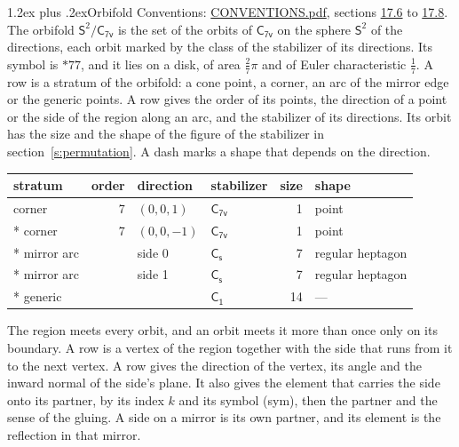 \documentclass[10pt,a4paper]{article}
\makeatletter
\renewcommand\section{\@startsection{section}{1}{\z@}{-3ex plus -1ex minus -.2ex}%
  {1.2ex plus .2ex}{\normalfont\large\sffamily\bfseries\color{parttitle}}}
\numberwithin{equation}{section}
\newcommand{\grp}[1]{\mathsf{#1}}
\newcommand{\orbname}[1]{#1}
\newcommand{\dirvec}[3]{(#1, #2, #3)}
\newcommand{\twosphere}{\mathsf{S}^{2}}
\makeatother
\begin{document}
\section{Orbifold}\label{s:orbifold}
Conventions: \href{../../CONVENTIONS.pdf}{CONVENTIONS.pdf}, sections \href{../../CONVENTIONS.pdf\#conv.17.6}{17.6} to \href{../../CONVENTIONS.pdf\#conv.17.8}{17.8}.
The orbifold $\twosphere/\grp{C_{7v}}$ is the set of the orbits of $\grp{C_{7v}}$ on the sphere $\twosphere$ of the directions, each orbit marked by the class of the stabilizer of its directions. Its symbol is $\orbname{{\ast}77}$, and it lies on a disk, of area $\tfrac{2}{7}\pi$ and of Euler characteristic $\tfrac{1}{7}$.
\leavevmode\label{n:head.stratum}\label{n:head.order.point}\label{n:head.direction}\label{n:head.stabilizer}\label{n:head.size.orbit}\label{n:head.shape}A row is a stratum of the orbifold: a cone point, a corner, an arc of the mirror edge or the generic points. A row gives the order of its points, the direction of a point or the side of the region along an arc, and the stabilizer of its directions. Its orbit has the size and the shape of the figure of the stabilizer in section~\ref{s:permutation}. A dash marks a shape that depends on the direction.
{\small\setlength{\tabcolsep}{4pt}\begin{longtable}{@{}lrllrl@{}}\toprule
stratum & order & direction & stabilizer & size & shape\\\midrule\endhead
\bottomrule\endfoot\endlastfoot
corner & 7 & $\dirvec{0}{0}{1}$ & \href{C7v.pdf}{$\grp{C_{7v}}$} & 1 & point\\*
corner & 7 & $\dirvec{0}{0}{-1}$ & \href{C7v.pdf}{$\grp{C_{7v}}$} & 1 & point\\*
mirror arc &  & side 0 & \href{C1v.pdf}{$\grp{C_{s}}$} & 7 & regular heptagon\\*
mirror arc &  & side 1 & \href{C1v.pdf}{$\grp{C_{s}}$} & 7 & regular heptagon\\*
generic &  &  & \href{C1.pdf}{$\grp{C_{1}}$} & 14 & ---\\
\bottomrule\end{longtable}}
\leavevmode\label{n:head.vertex.region}\label{n:head.angle}\label{n:head.normal.side}\label{n:head.partner}\label{n:head.sense}The region meets every orbit, and an orbit meets it more than once only on its boundary. A row is a vertex of the region together with the side that runs from it to the next vertex. A row gives the direction of the vertex, its angle and the inward normal of the side's plane. It also gives the element that carries the side onto its partner, by its index $k$ and its symbol (sym), then the partner and the sense of the gluing. A side on a mirror is its own partner, and its element is the reflection in that mirror.
\end{document}

